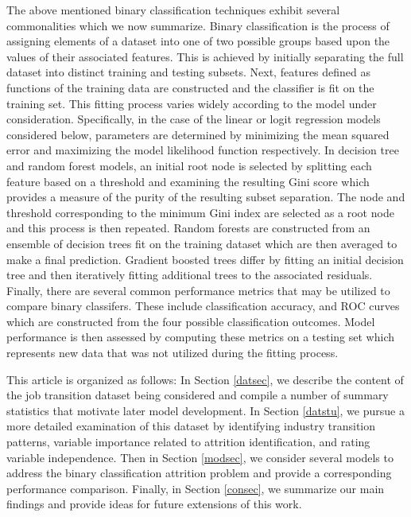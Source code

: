 \documentclass[10pt]{article}
\begin{document}
The above mentioned binary classification techniques exhibit several 
commonalities which we now summarize. 
Binary classification is the process of assigning elements of a dataset into 
one of two possible groups based upon the values of their associated features.
This is achieved by initially separating the full dataset into distinct training 
and testing subsets.  Next, features defined as functions of the training 
data are constructed and the classifier is fit on the training set. This fitting 
process varies widely according to the model under consideration.  Specifically,  
in the case of the linear or logit regression models considered below, parameters are determined by 
minimizing the mean squared error and maximizing the model likelihood function 
respectively.  In decision tree and random forest models, an initial root 
node is selected by splitting each feature based on a threshold and 
examining the resulting Gini score which provides a measure of the purity of the 
    resulting subset separation.  The node and threshold 
    corresponding to the minimum Gini index are selected as a root node 
    and this process is then repeated.  Random forests are constructed 
    from an ensemble of decision trees fit on the training 
    dataset which are then averaged to make a final prediction. 
    Gradient boosted trees differ by fitting an initial decision tree 
    and then iteratively fitting additional trees 
    to the associated residuals.
    Finally, there are several common performance metrics that may 
    be utilized to compare binary classifers.  These include classification 
    accuracy, and ROC curves
    which are constructed from the four possible classification outcomes.
Model 
performance is then assessed by computing these metrics on a testing set which represents new data
that was not utilized during the fitting process.

This article is organized as follows: In Section \ref{datsec}, we describe the content 
of the job transition dataset being considered and compile a number of 
summary statistics that motivate later model development.  In Section \ref{datstu},
we pursue a more detailed examination of this dataset by identifying industry transition 
patterns, variable importance related to attrition identification, and 
rating variable independence.  Then in Section \ref{modsec}, we consider several 
models to address the binary classification attrition problem and provide a 
corresponding performance comparison.  Finally, in Section \ref{consec}, we 
summarize our main findings and provide ideas for future extensions of this work.
\end{document}
